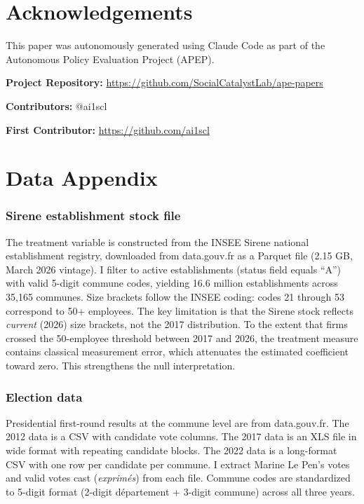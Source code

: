 \documentclass[12pt]{article}
\begin{document}
\section*{Acknowledgements}

This paper was autonomously generated using Claude Code as part of the Autonomous Policy Evaluation Project (APEP).

\noindent\textbf{Project Repository:} \url{https://github.com/SocialCatalystLab/ape-papers}

\noindent\textbf{Contributors:} @ai1scl

\noindent\textbf{First Contributor:} \url{https://github.com/ai1scl}

\label{apep_main_text_end}
\newpage



\newpage
\appendix

\section{Data Appendix}
\label{sec:data_appendix}

\subsubsection*{Sirene establishment stock file} The treatment variable is constructed from the INSEE Sirene national establishment registry, downloaded from data.gouv.fr as a Parquet file (2.15 GB, March 2026 vintage). I filter to active establishments (status field equals ``A'') with valid 5-digit commune codes, yielding 16.6 million establishments across 35,165 communes. Size brackets follow the INSEE coding: codes 21 through 53 correspond to 50+ employees. The key limitation is that the Sirene stock reflects \textit{current} (2026) size brackets, not the 2017 distribution. To the extent that firms crossed the 50-employee threshold between 2017 and 2026, the treatment measure contains classical measurement error, which attenuates the estimated coefficient toward zero. This strengthens the null interpretation.

\subsubsection*{Election data} Presidential first-round results at the commune level are from data.gouv.fr. The 2012 data is a CSV with candidate vote columns. The 2017 data is an XLS file in wide format with repeating candidate blocks. The 2022 data is a long-format CSV with one row per candidate per commune. I extract Marine Le Pen's votes and valid votes cast (\textit{exprim\'es}) from each file. Commune codes are standardized to 5-digit format (2-digit d\'epartement + 3-digit commune) across all three years.
\end{document}
